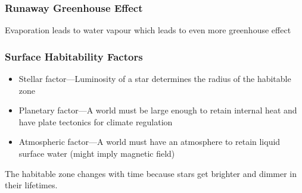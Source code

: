 \documentclass[class=article, crop=false]{standalone}
\begin{document}
  \subsubsection{Runaway Greenhouse Effect}
  Evaporation leads to water vapour which leads to even more greenhouse effect
  \subsubsection{Surface Habitability Factors}
  \begin{itemize}
    \item Stellar factor---Luminosity of a star determines the radius of the habitable zone
    \item Planetary factor---A world must be large enough to retain internal heat and have plate tectonics for climate regulation
    \item Atmospheric factor---A world must have an atmosphere to retain liquid surface water (might imply magnetic field)
  \end{itemize}
  \begin{note}{}
    The habitable zone changes with time because stars get brighter and dimmer in their lifetimes.
  \end{note}
\end{document}

